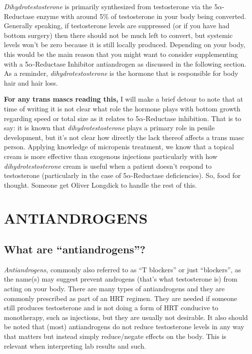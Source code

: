 \documentclass{article}
\begin{document}
\textit{Dihydrotestosterone} is primarily synthesized from testosterone via the 5$\alpha$-Reductase enzyme with around 5\% of testosterone in your body being converted. Generally speaking, if testosterone levels are suppressed (or if you have had bottom surgery) then there should not be much left to convert, but systemic levels won’t be zero because it is still locally produced. Depending on your body, this would be the main reason that you might want to consider supplementing with a 5$\alpha$-Reductase Inhibitor antiandrogen as discussed in the following section. As a reminder, \textit{dihydrotestosterone }is the hormone that is responsible for body hair and hair loss.

\textbf{For any trans mascs reading this,} I will make a brief detour to note that at time of writing it is not clear what role the hormone plays with bottom growth regarding speed or total size as it relates to 5$\alpha$-Reductase inhibition. That is to say: it is known that \textit{dihydrotestosterone }plays a primary role in penile development, but it’s not clear how directly the lack thereof affects a trans masc person. Applying knowledge of micropenis treatment, we know that a topical cream is more effective than exogenous injections particularly with how \textit{dihydrotestosterone }cream is useful when a patient doesn’t respond to testosterone (particularly in the case of 5$\alpha$-Reductase deficiencies). So, food for thought. Someone get Oliver Longdick to handle the rest of this.

 

\section{ANTIANDROGENS}\label{AA}

\subsection{What are “antiandrogens”?}

\textit{Antiandrogens, }commonly also referred to as “T blockers” or just “blockers”, as the name(s) may suggest prevent androgens (that’s what testosterone is) from acting on your body. There are many types of antiandrogens and they are commonly prescribed as part of an HRT regimen. They are needed if someone still produces testosterone and is not doing a form of HRT conducive to monotherapy, such as injections, but they are usually not desirable. It also should be noted that (most) antiandrogens do not reduce testosterone levels in any way that matters but instead simply reduce/negate effects on the body. This is relevant when interpreting lab results and such.
\end{document}
